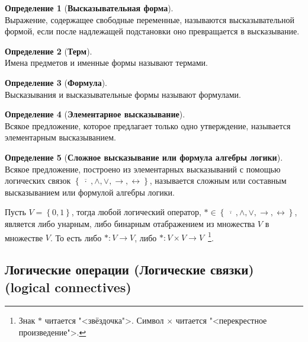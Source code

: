 \documentclass[fleqn,11pt]{article}
\theoremstyle{definition}
\newtheorem{definition}{Определение}
\begin{document}
\begin{definition}[\textbf{Высказывательная форма}] ~\\
	Выражение, содержащее свободные переменные, называются высказывательной формой, если после
	надлежащей подстановки оно превращается в высказывание.
\end{definition}

\begin{definition}[\textbf{Терм}] ~\\
	Имена предметов и именные формы называют термами.
\end{definition}

\begin{definition}[\textbf{Формула}] ~\\
	Высказывания и высказывательные формы называют формулами.
\end{definition}

\begin{definition}[\textbf{Элементарное высказывание}] ~\\
Всякое предложение, которое предлагает только одно утверждение, называется элементарным высказыванием.
\end{definition}

\begin{definition}[\textbf{Сложное высказывание или формула алгебры логики}] ~\\
	Всякое предложение, построено из элементарных высказываний с помощью логических связок
	$\left\{\overline{\;\cdot\;}, \land, \lor, \rightarrow, \leftrightarrow \right\}$, называется сложным или
	составным высказыванием или формулой алгебры логики.
\end{definition}
Пусть $V = \left\{0,1\right\}$, тогда любой логический оператор,
$\ast \in \left\{\overline{\;\cdot\;}, \land, \lor, \rightarrow, \leftrightarrow\right\}$,
является либо унарным, либо бинарным отабражением из множества $V$ в множестве $V$. То есть
либо $\ast : V \to V$, либо $\ast : V \times V \to V$~\footnote{Знак $\ast$ читается "<звёздочка">.
Символ $\times$ читается "<перекрестное произведение">.}.

\subsection{Логические операции (Логические связки) (logical connectives)}
\end{document}
